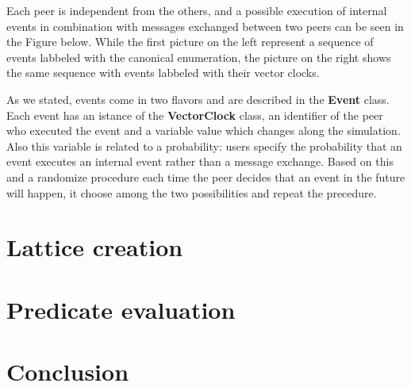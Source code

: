 \documentclass[11pt]{article}
\begin{document}


\noindent
Each peer is independent from the others, and a possible execution of internal events in combination with messages exchanged between two peers can be seen in the Figure below. While the first picture on the left represent a sequence of events labbeled with the canonical enumeration, the picture on the right shows the same sequence with events labbeled with their vector clocks.

\begin{figure}[ht]
	\centering
	\begin{minipage}{.5\textwidth}
	  \scalebox{.8}{}
	\end{minipage}%
	\begin{minipage}{.5\textwidth}
	  \scalebox{.8}{}
	\end{minipage}
\end{figure}

As we stated, events come in two flavors and are described in the \textbf{Event} class. Each event has an istance of the \textbf{VectorClock} class, an identifier of the peer who executed the event and a variable value which changes along the simulation. Also this variable is related to a probability: users specify the probability that an event executes an internal event rather than a message exchange. Based on this and a randomize procedure each time the peer decides that an event in the future will happen, it choose among the two possibilities and repeat the precedure.

\section{Lattice creation}

\section{Predicate evaluation}

\section{Conclusion}



\end{document}
